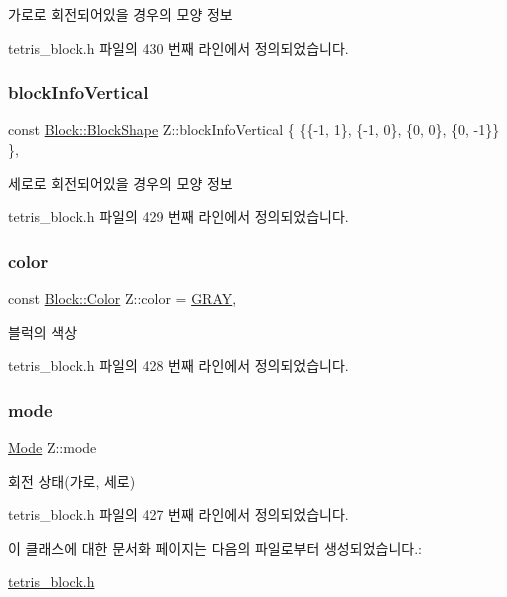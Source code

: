 가로로 회전되어있을 경우의 모양 정보 



tetris\+\_\+block.\+h 파일의 430 번째 라인에서 정의되었습니다.

\mbox{\label{class_z_abf77b0c1e705c62c51396f55579a8fa3}} 
\subsubsection{\texorpdfstring{block\+Info\+Vertical}{blockInfoVertical}}
{\footnotesize\ttfamily const \mbox{\hyperlink{class_block_aca5d951639f113e2ebd7856209d6b9ab}{Block\+::\+Block\+Shape}} Z\+::block\+Info\+Vertical \{ \{\{-\/1, 1\}, \{-\/1, 0\}, \{0, 0\}, \{0, -\/1\}\} \}\hspace{0.3cm}{\ttfamily [static]}, {\ttfamily [private]}}



세로로 회전되어있을 경우의 모양 정보 



tetris\+\_\+block.\+h 파일의 429 번째 라인에서 정의되었습니다.

\mbox{\label{class_z_aee843d60621178a7ea41811477311b8d}} 
\subsubsection{\texorpdfstring{color}{color}}
{\footnotesize\ttfamily const \mbox{\hyperlink{class_block_ad054b4ac51df79aa910040b2a2fdf7b5}{Block\+::\+Color}} Z\+::color = \mbox{\hyperlink{class_block_ad054b4ac51df79aa910040b2a2fdf7b5a1158efe2e537f0b96f9ea590f22ab821}{G\+R\+AY}}\hspace{0.3cm}{\ttfamily [static]}, {\ttfamily [private]}}



블럭의 색상 



tetris\+\_\+block.\+h 파일의 428 번째 라인에서 정의되었습니다.

\mbox{\label{class_z_a8324fb6e9f23196a9649ab838aabcc74}} 
\subsubsection{\texorpdfstring{mode}{mode}}
{\footnotesize\ttfamily \mbox{\hyperlink{class_block_a33a96023993478ad4b52426188454765}{Mode}} Z\+::mode\hspace{0.3cm}{\ttfamily [private]}}



회전 상태(가로, 세로) 



tetris\+\_\+block.\+h 파일의 427 번째 라인에서 정의되었습니다.



이 클래스에 대한 문서화 페이지는 다음의 파일로부터 생성되었습니다.\+:\begin{DoxyCompactItemize}
\item 
\mbox{\hyperlink{tetris__block_8h}{tetris\+\_\+block.\+h}}\end{DoxyCompactItemize}
